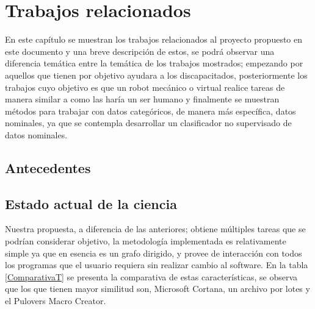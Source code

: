 
\chapter{Trabajos relacionados}
\label{sec:chapter2}

En este cap\'itulo se muestran los trabajos relacionados al proyecto propuesto
 en este documento y una breve descripci\'on de estos, se podr\'a observar una
 diferencia tem\'atica entre la tem\'atica de los trabajos mostrados; empezando 
 por aquellos que tienen por objetivo ayudara a los discapacitados, 
 posteriormente los trabajos cuyo objetivo es que un robot mec\'anico o virtual 
 realice tareas de manera similar a como las har\'ia un ser humano y finalmente 
 se muestran m\'etodos para trabajar con datos categ\'oricos, de manera m\'as 
 espec\'ifica, datos nominales, ya que se contempla desarrollar un clasificador 
 no supervisado de datos nominales.
 

\section{Antecedentes}






\section{Estado actual de la ciencia}








Nuestra propuesta, a diferencia de las anteriores; obtiene m\'ultiples tareas
 que se podrían considerar objetivo, la metodolog\'ia implementada es 
 relativamente simple ya que en esencia es un grafo dirigido, y provee de 
 interacci\'on con todos los programas que el usuario requiera sin realizar 
 cambio al software. En la tabla \ref{ComparativaT} se presenta la comparativa 
 de estas caracter\'isticas, se observa que los que tienen mayor similitud son, 
 Microsoft Cortana, un archivo por lotes y el Pulover\textsc{}s Macro 
 Creator.


